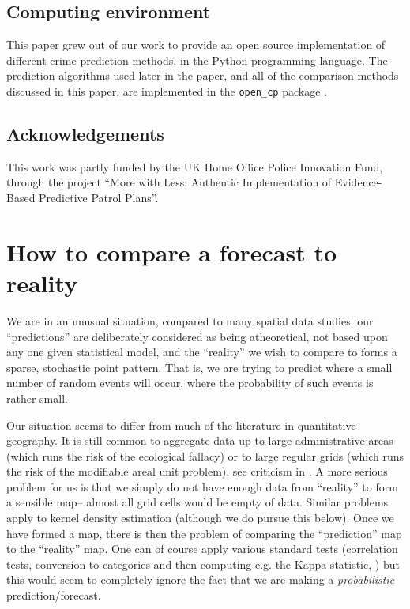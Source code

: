 \documentclass[twoside,a4paper,twocolumn,10pt]{article}
\theoremstyle{plain}
\theoremstyle{definition}
\begin{document}
\subsection{Computing environment}

This paper grew out of our work to provide an open source implementation of
different crime prediction methods, in the Python programming language.
The prediction algorithms used later in the paper, and all of the comparison
methods discussed in this paper, are implemented in the \texttt{open\_cp} package
\cite{opencp}.



\subsection{Acknowledgements}

This work was partly funded by the UK Home Office Police Innovation Fund, through the
project ``More with Less: Authentic Implementation of Evidence-Based Predictive
Patrol Plans''.



\section{How to compare a forecast to reality}

We are in an unusual situation, compared to many spatial data studies: our ``predictions''
are deliberately considered as being atheoretical, not based upon any one given statistical
model, and the ``reality'' we wish to compare to forms a sparse, stochastic point pattern.
That is, we are trying to predict where a small number of random events will occur, where
the probability of such events is rather small.

Our situation seems to differ from much of the literature in quantitative geography.
It is still common to aggregate data up to large administrative areas (which runs the risk
of the ecological fallacy) or to large regular grids (which runs the risk of the
modifiable areal unit problem), see criticism in \cite{cr, wrigley}.
A more serious problem for us is that we simply do not have enough data from ``reality''
to form a sensible map-- almost all grid cells would be empty of data.  Similar problems apply
to kernel density estimation (although we do pursue this below).  Once we have formed a map,
there is then the problem of comparing the ``prediction'' map to the ``reality'' map.  One
can of course apply various standard tests (correlation tests, conversion to categories
and then computing e.g. the Kappa statistic, \cite{hz}) but this would seem to
completely ignore the fact that we are making a \emph{probabilistic} prediction/forecast.
\end{document}
